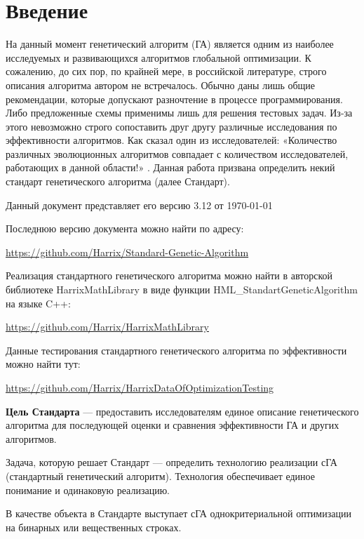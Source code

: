 \chapter*{Введение}
\singlespacing
На данный момент генетический алгоритм (ГА) является одним из наиболее исследуемых и развивающихся алгоритмов глобальной оптимизации. К сожалению, до сих пор, по крайней мере, в российской литературе, строго описания алгоритма автором не встречалось. Обычно даны лишь общие рекомендации, которые допускают разночтение в процессе программирования. Либо предложенные схемы применимы лишь для решения тестовых задач. Из-за этого невозможно строго сопоставить друг другу различные исследования по эффективности алгоритмов. Как сказал один из исследователей: «Количество различных эволюционных алгоритмов совпадает с количеством исследователей, работающих в данной области!» \cite{web:makeingsimpleGA}. Данная работа призвана определить некий стандарт генетического алгоритма (далее Стандарт).

Данный документ представляет его версию 3.12 от \today

Последнюю версию документа можно найти по адресу:

\href{https://github.com/Harrix/Standard-Genetic-Algorithm}{https://github.com/Harrix/Standard-Genetic-Algorithm}

Реализация стандартного генетического алгоритма можно найти в авторской библиотеке HarrixMathLibrary в виде функции HML\_StandartGeneticAlgorithm на языке C++:

\href{https://github.com/Harrix/HarrixMathLibrary}{https://github.com/Harrix/HarrixMathLibrary}

Данные тестирования стандартного генетического алгоритма по эффективности можно найти тут:

\href{https://github.com/Harrix/HarrixDataOfOptimizationTesting}{https://github.com/Harrix/HarrixDataOfOptimizationTesting}

\textbf{Цель Стандарта} --- предоставить исследователям единое описание генетического алгоритма для последующей оценки и сравнения эффективности ГА и других алгоритмов. 

Задача, которую решает Стандарт --- определить технологию реализации сГА (стандартный генетический алгоритм). Технология обеспечивает единое понимание и одинаковую реализацию.

В качестве объекта в Стандарте выступает сГА однокритериальной оптимизации на бинарных или вещественных строках.

